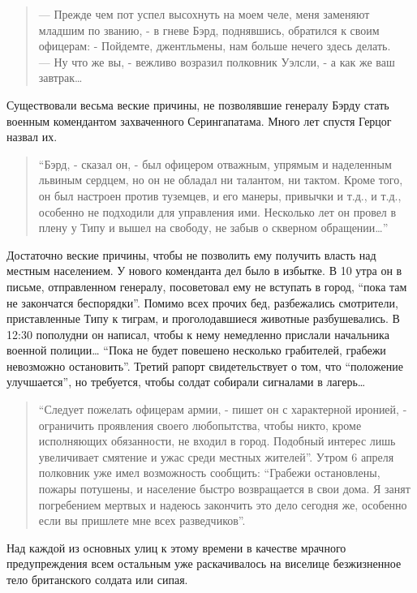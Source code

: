 \documentclass[
  oneside,
  12pt,
  titlepage]{book}
\begin{document}
\begin{quote}
--- Прежде чем пот успел высохнуть на моем челе, меня заменяют младшим по званию, - в гневе Бэрд, поднявшись, обратился к своим офицерам: - Пойдемте, джентльмены, нам больше нечего здесь делать.\\
--- Ну что же вы, - вежливо возразил полковник Уэлсли, - а как же ваш завтрак\ldots{}
\end{quote}

Существовали весьма веские причины, не позволявшие генералу Бэрду стать военным комендантом захваченного Серингапатама. Много лет спустя Герцог назвал их.

\begin{quote}
``Бэрд, - сказал он, - был офицером отважным, упрямым и наделенным львиным сердцем, но он не обладал ни талантом, ни тактом. Кроме того, он был настроен против туземцев, и его манеры, привычки и т.д., и т.д., особенно не подходили для управления ими. Несколько лет он провел в плену у Типу и вышел на свободу, не забыв о скверном обращении\ldots{}''
\end{quote}

Достаточно веские причины, чтобы не позволить ему получить власть над местным населением. У нового коменданта дел было в избытке. В 10 утра он в письме, отправленном генералу, посоветовал ему не вступать в город, ``пока там не закончатся беспорядки''. Помимо всех прочих бед, разбежались смотрители, приставленные Типу к тиграм, и проголодавшиеся животные разбушевались. В 12:30 пополудни он написал, чтобы к нему немедленно прислали начальника военной полиции\ldots{} ``Пока не будет повешено несколько грабителей, грабежи невозможно остановить''. Третий рапорт свидетельствует о том, что ``положение улучшается'', но требуется, чтобы солдат собирали сигналами в лагерь\ldots{}

\begin{quote}
``Следует пожелать офицерам армии, - пишет он с характерной иронией, - ограничить проявления своего любопытства, чтобы никто, кроме исполняющих обязанности, не входил в город. Подобный интерес лишь увеличивает смятение и ужас среди местных жителей''. Утром 6 апреля полковник уже имел возможность сообщить: ``Грабежи остановлены, пожары потушены, и население быстро возвращается в свои дома. Я занят погребением мертвых и надеюсь закончить это дело сегодня же, особенно если вы пришлете мне всех разведчиков''.
\end{quote}

Над каждой из основных улиц к этому времени в качестве мрачного предупреждения всем остальным уже раскачивалось на виселице безжизненное тело британского солдата или сипая.
\end{document}

